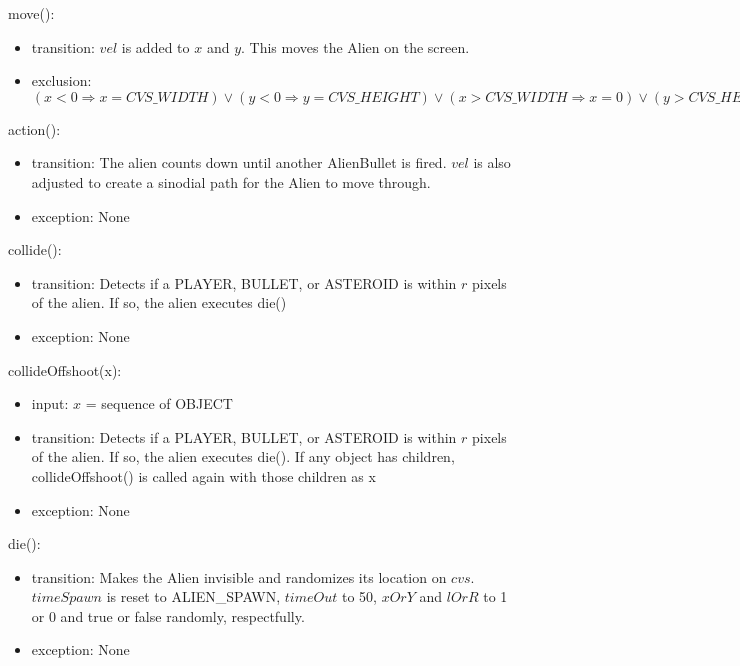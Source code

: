 \documentclass[12pt]{article}
\begin{document}
\noindent move():
\begin{itemize}
  \item transition: $vel$ is added to $x$ and $y$. This moves the Alien on the screen.
  \item exclusion: $(x < 0 \Rightarrow x = CVS\_WIDTH) \lor (y < 0 \Rightarrow y = CVS\_HEIGHT) \lor (x > CVS\_WIDTH \Rightarrow x = 0) \lor (y > CVS\_HEIGHT \Rightarrow y = 0)$
\end{itemize}

\noindent action():
\begin{itemize}
  \item transition: The alien counts down until another AlienBullet is fired. $vel$ is also adjusted to create a sinodial path for the Alien to move through.
  \item exception: None
\end{itemize}

\noindent collide():
\begin{itemize}
  \item transition: Detects if a PLAYER, BULLET, or ASTEROID is within $r$ pixels of the alien. If so, the alien executes die()
  \item exception: None
\end{itemize}

\noindent collideOffshoot(x):
\begin{itemize}
  \item input: $x$ = sequence of OBJECT
  \item transition: Detects if a PLAYER, BULLET, or ASTEROID is within $r$ pixels of the alien. If so, the alien executes die(). If any object has children, collideOffshoot() is called again with those children as x
  \item exception: None
\end{itemize}

\noindent die():
\begin{itemize}
  \item transition: Makes the Alien invisible and randomizes its location on $cvs$. $timeSpawn$ is reset to ALIEN\_SPAWN, $timeOut$ to 50, $xOrY$ and $lOrR$ to 1 or 0 and true or false randomly, respectfully.
  \item exception: None
\end{itemize}

\newpage
\end{document}
